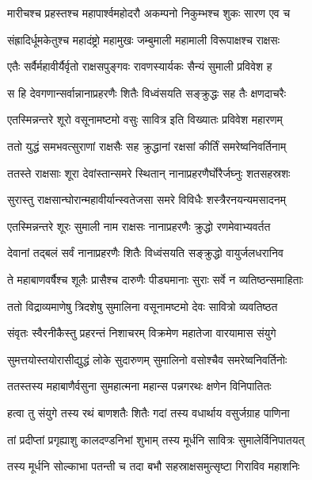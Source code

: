 \twolineshloka
{मारीचश्च प्रहस्तश्च महापार्श्वमहोदरौ}
{अकम्पनो निकुम्भश्च शुकः सारण एव च} %

\twolineshloka
{संह्रादिर्धूमकेतुश्च महादंष्ट्रो महामुखः}
{जम्बुमाली महामाली विरूपाक्षश्च राक्षसः} %

\twolineshloka
{एतैः सर्वैर्महावीर्यैर्वृतो राक्षसपुङ्गवः}
{रावणस्यार्यकः सैन्यं सुमाली प्रविवेश ह} %

\twolineshloka
{स हि देवगणान्सर्वान्नानाप्रहरणैः शितैः}
{विध्वंसयति सङ्क्रुद्धः सह तैः क्षणदाचरैः} %

\twolineshloka
{एतस्मिन्नन्तरे शूरो वसूनामष्टमो वसुः}
{सावित्र इति विख्यातः प्रविवेश महारणम्} %

\twolineshloka
{ततो युद्धं समभवत्सुराणां राक्षसैः सह}
{क्रुद्धानां रक्षसां कीर्तिं समरेष्वनिवर्तिनाम्} %

\twolineshloka
{ततस्ते राक्षसाः शूरा देवांस्तान्समरे स्थितान्}
{नानाप्रहरणैर्घोरैर्जघ्नुः शतसहस्रशः} %

\twolineshloka
{सुरास्तु राक्षसान्घोरान्महावीर्यान्स्वतेजसा}
{समरे विविधैः शस्त्रैरनयन्यमसादनम्} %

\twolineshloka
{एतस्मिन्नन्तरे शूरः सुमाली नाम राक्षसः}
{नानाप्रहरणैः क्रुद्धो रणमेवाभ्यवर्तत} %

\twolineshloka
{देवानां तद्बलं सर्वं नानाप्रहरणैः शितैः}
{विध्वंसयति सङ्क्रुद्धो वायुर्जलधरानिव} %

\twolineshloka
{ते महाबाणवर्षैश्च शूलैः प्रासैश्च दारुणैः}
{पीड्यमानाः सुराः सर्वे न व्यतिष्ठन्समाहिताः} %

\twolineshloka
{ततो विद्राव्यमाणेषु त्रिदशेषु सुमालिना}
{वसूनामष्टमो देवः सावित्रो व्यवतिष्ठत} %

\twolineshloka
{संवृतः स्वैरनीकैस्तु प्रहरन्तं निशाचरम्}
{विक्रमेण महातेजा वारयामास संयुगे} %

\twolineshloka
{सुमत्तयोस्तयोरासीद्युद्धं लोके सुदारुणम्}
{सुमालिनो वसोश्चैव समरेष्वनिवर्तिनोः} %

\twolineshloka
{ततस्तस्य महाबाणैर्वसुना सुमहात्मना}
{महान्स पन्नगरथः क्षणेन विनिपातितः} %

\twolineshloka
{हत्वा तु संयुगे तस्य रथं बाणशतैः शितैः}
{गदां तस्य वधार्थाय वसुर्जग्राह पाणिना} %

\twolineshloka
{तां प्रदीप्तां प्रगृह्याशु कालदण्डनिभां शुभाम्}
{तस्य मूर्धनि सावित्रः सुमालेर्विनिपातयत्} %

\twolineshloka
{तस्य मूर्धनि सोल्काभा पतन्ती च तदा बभौ}
{सहस्राक्षसमुत्सृष्टा गिराविव महाशनिः} %

